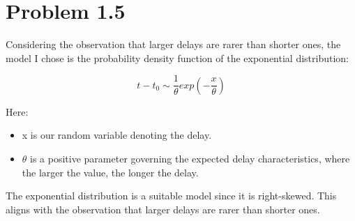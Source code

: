 \documentclass{article}
\begin{document}
\FloatBarrier
\section*{Problem 1.5}
Considering the observation that larger delays are rarer than shorter ones, the model I chose is the probability density function of the exponential distribution: 

\[t - t_0 \sim \frac{1}{\theta}exp(-\frac{x}{\theta})\] 

Here:
\begin{itemize}
    \item x is our random variable denoting the delay.
    \item $\theta$ is a positive parameter governing the expected delay characteristics, where the larger the value, the longer the delay.
\end{itemize}

The exponential distribution is a suitable model since it is right-skewed. This aligns with the observation that larger delays are rarer than shorter ones.

\FloatBarrier
\end{document}
